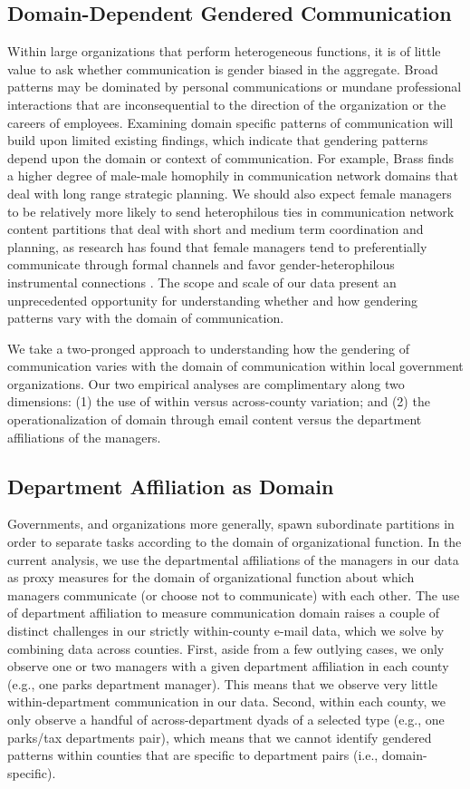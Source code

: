 \documentclass{pnastwo}
\begin{document}
\begin{article}
\section{Domain-Dependent Gendered Communication}
Within large organizations that perform heterogeneous functions, it is of little value to ask whether communication is gender biased in the aggregate. Broad patterns may be dominated by personal communications or mundane professional interactions that are inconsequential to the direction of the organization or the careers of employees. Examining domain specific patterns of communication will build upon limited existing findings, which indicate that gendering patterns depend upon the domain or context of communication. For example, Brass \citep{Brass1985} finds a higher degree of male-male homophily in communication network domains that deal with long range strategic planning. We should also expect female managers to be relatively more likely to send heterophilous ties in communication network content partitions that deal with short and medium term coordination and planning, as research has found that female managers tend to preferentially communicate through formal channels  \citep{Ragins1989} and favor gender-heterophilous instrumental connections \citep{Ibarra1992}. The scope and scale of our data present an unprecedented opportunity for understanding whether and how gendering patterns vary with the domain of communication.

We take a two-pronged approach to understanding how the gendering of communication varies with the domain of communication within local government organizations. Our two empirical analyses are complimentary along two dimensions: (1) the use of within versus across-county variation; and (2) the operationalization of domain through email content versus the department affiliations of the managers. 

\subsection{Department Affiliation as Domain}

Governments, and organizations more generally, spawn subordinate partitions in order to separate tasks according to the domain of organizational function. In the current analysis, we use the departmental affiliations of the managers in our data as proxy measures for the domain of organizational function about which managers communicate (or choose not to communicate) with each other. The use of department affiliation to measure communication domain raises a couple of distinct challenges in our strictly within-county e-mail data, which we solve by combining data across counties. First, aside from a few outlying cases, we only observe one or two managers with a given department affiliation in each county (e.g., one parks department manager). This means that we observe very little within-department communication in our data. Second, within each county, we only observe a handful of across-department dyads of a selected type (e.g., one parks/tax departments pair), which means that we cannot identify gendered patterns within counties that are specific to department pairs (i.e., domain-specific).


\end{article}
\end{document}
